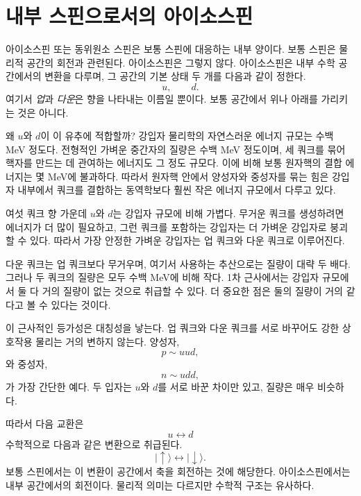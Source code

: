 \section{내부 스핀으로서의 아이소스핀}

아이소스핀 또는 동위원소 스핀은 보통 스핀에 대응하는 내부 양이다. 보통 스핀은 물리적 공간의 회전과 관련된다. 아이소스핀은 그렇지 않다. 아이소스핀은 내부 수학 공간에서의 변환을 다루며, 그 공간의 기본 상태 두 개를 다음과 같이 정한다.
\begin{equation}
u,\qquad d.
\end{equation}
여기서 \emph{업}과 \emph{다운}은 향을 나타내는 이름일 뿐이다. 보통 공간에서 위나 아래를 가리키는 것은 아니다.


왜 \(u\)와 \(d\)이 이 유추에 적합할까? 강입자 물리학의 자연스러운 에너지 규모는 수백 MeV 정도다. 전형적인 가벼운 중간자의 질량은 수백 MeV 정도이며, 세 쿼크를 묶어 핵자를 만드는 데 관여하는 에너지도 그 정도 규모다. 이에 비해 보통 원자핵의 결합 에너지는 몇 MeV에 불과하다. 따라서 원자핵 안에서 양성자와 중성자를 묶는 힘은 강입자 내부에서 쿼크를 결합하는 동역학보다 훨씬 작은 에너지 규모에서 다루고 있다.

여섯 쿼크 향 가운데 \(u\)와 \(d\)는 강입자 규모에 비해 가볍다. 무거운 쿼크를 생성하려면 에너지가 더 많이 필요하고, 그런 쿼크를 포함하는 강입자는 더 가벼운 강입자로 붕괴할 수 있다. 따라서 가장 안정한 가벼운 강입자는 업 쿼크와 다운 쿼크로 이루어진다.

다운 쿼크는 업 쿼크보다 무거우며, 여기서 사용하는 추산으로는 질량이 대략 두 배다. 그러나 두 쿼크의 질량은 모두 수백 MeV에 비해 작다. 1차 근사에서는 강입자 규모에서 둘 다 거의 질량이 없는 것으로 취급할 수 있다. 더 중요한 점은 둘의 질량이 거의 같다고 볼 수 있다는 것이다.

이 근사적인 등가성은 대칭성을 낳는다. 업 쿼크와 다운 쿼크를 서로 바꾸어도 강한 상호작용 물리는 거의 변하지 않는다. 양성자,
\begin{equation}
p\sim uud,
\end{equation}
와 중성자,
\begin{equation}
n\sim udd,
\end{equation}
가 가장 간단한 예다. 두 입자는 \(u\)와 \(d\)를 서로 바꾼 차이만 있고, 질량은 매우 비슷하다.

따라서 다음 교환은
\begin{equation}
u\longleftrightarrow d
\end{equation}
수학적으로 다음과 같은 변환으로 취급된다.
\begin{equation}
|\uparrow\rangle\longleftrightarrow|\downarrow\rangle.
\end{equation}
보통 스핀에서는 이 변환이 공간에서 축을 회전하는 것에 해당한다. 아이소스핀에서는 내부 공간에서의 회전이다. 물리적 의미는 다르지만 수학적 구조는 유사하다.

